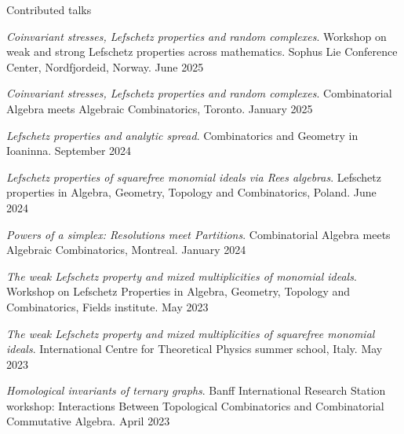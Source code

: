 \documentclass[12pt]{resume} %
\begin{document}
\begin{rSection}{Contributed talks}
    \item \textit{Coinvariant stresses, Lefschetz properties and random complexes}. Workshop on weak and strong Lefschetz properties across mathematics. Sophus Lie Conference Center, Nordfjordeid, Norway. June 2025 
    \item \textit{Coinvariant stresses, Lefschetz properties and random complexes}. Combinatorial Algebra meets Algebraic Combinatorics, Toronto. January 2025 
    \item \textit{Lefschetz properties and analytic spread}. Combinatorics and Geometry in Ioaninna. September 2024 
    \item \textit{Lefschetz properties of squarefree monomial ideals via Rees algebras}. Lefschetz properties in Algebra, Geometry, Topology and Combinatorics, Poland. June 2024  
    \item \textit{Powers of a simplex: Resolutions meet Partitions}. Combinatorial Algebra meets Algebraic Combinatorics, Montreal. January 2024 
    \item \textit{The weak Lefschetz property and mixed multiplicities of monomial ideals}. Workshop on Lefschetz Properties in Algebra, Geometry, Topology and Combinatorics, Fields institute. May 2023 
    \item \textit{The weak Lefschetz property and mixed multiplicities of squarefree monomial ideals}. International Centre for Theoretical Physics summer school, Italy. May 2023 
    \item \textit{Homological invariants of ternary graphs}. Banff International Research Station workshop: Interactions Between Topological Combinatorics and Combinatorial Commutative Algebra. April 2023 

\end{rSection}
\end{document}
